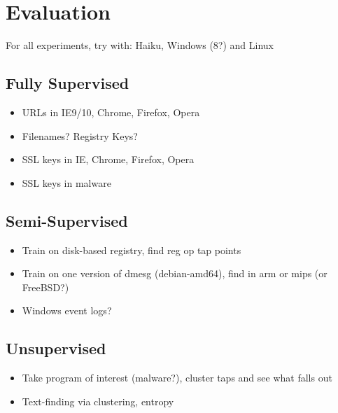 \section{Evaluation}
\label{sec:eval}

For all experiments, try with: Haiku, Windows (8?) and Linux

\subsection{Fully Supervised}
\label{sec:eval:subsec:supervised}
\begin{itemize}
\item URLs in IE9/10, Chrome, Firefox, Opera
\item Filenames? Registry Keys?
\item SSL keys in IE, Chrome, Firefox, Opera
\item SSL keys in malware
\end{itemize}

\subsection{Semi-Supervised}
\label{sec:eval:subsec:semisupervised}
\begin{itemize}
\item Train on disk-based registry, find reg op tap points
\item Train on one version of dmesg (debian-amd64), find in arm or mips (or FreeBSD?)
\item Windows event logs?
\end{itemize}

\subsection{Unsupervised}
\label{sec:eval:subsec:unsupervised}
\begin{itemize}
\item Take program of interest (malware?), cluster taps and see what falls out
\item Text-finding via clustering, entropy
\end{itemize}
